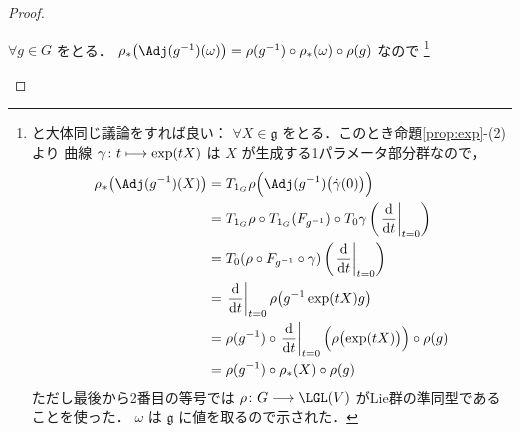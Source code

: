 \documentclass[TQFT_main]{subfiles}
\begin{document}
\begin{proof}
\begin{enumerate}
\begin{description}
            $\forall g \in G$ をとる．
            $\rho_* \bigl( \Adj(g^{-1})(\omega) \bigr) = \rho(g^{-1}) \circ \rho_*(\omega) \circ \rho(g)$ なので
            \footnote{
                と大体同じ議論をすれば良い：
                $\forall X \in \mathfrak{g}$ をとる．このとき命題\ref{prop:exp}-(2) より \cinfty 曲線 $\gamma \colon t \longmapsto \exp(tX)$ は $X$ が生成する1パラメータ部分群なので，
                \begin{align}
                    \rho_* \bigl(\Adj(g^{-1})(X)  \bigr)
                    &= T_{1_G} \rho \Bigl(\Adj(g^{-1})\bigl(\dot{\gamma}(0)\bigr) \Bigr)   \\
                    &= T_{1_G} \rho \circ T_{1_G}(F_{g^{-1}}) \circ T_0 \gamma \left( \eval{\dv{}{t}}_{t=0} \right)  \\
                    &= T_{0}(\rho \circ F_{g^{-1}} \circ \gamma) \left( \eval{\dv{}{t}}_{t=0} \right) \\
                    &= \eval{\dv{}{t}}_{t=0} \rho\bigl(g^{-1} \exp(tX) g\bigr) \\
                    &= \rho(g^{-1}) \circ \eval{\dv{}{t}}_{t=0}\Bigl(\rho\bigl(\exp(tX)\bigr) \Bigr) \circ \rho(g) \\
                    &= \rho(g^{-1}) \circ \rho_*(X) \circ \rho(g)
                \end{align}
                ただし最後から2番目の等号では $\rho \colon G \lto \LGL (V)$ がLie群の準同型であることを使った．
                $\omega$ は $\mathfrak{g}$ に値を取るので示された．
            }
                

\end{description}
\end{enumerate}
\end{proof}
\end{document}
